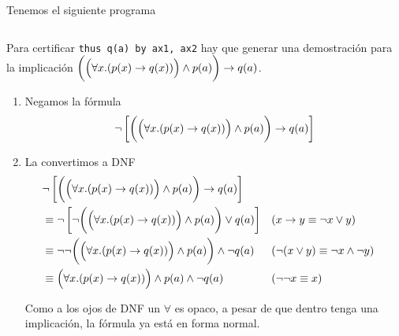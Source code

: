 \begin{ejemplo}
    Tenemos el siguiente programa

    \begin{figure}[H]
        \centering
        \begin{tabular}{c}
            
        \end{tabular}
    \end{figure}

    Para certificar \lstinline{thus q(a) by ax1, ax2} hay que generar una
    demostración para la implicación \(
        \bigg(\Big(\forall x. (p(x) \to q(x))\Big) \wedge p(a) \bigg)
        \to q(a)
    \).

    \begin{enumerate}
        \item Negamos la fórmula 
        \[
            \neg \left[
            \bigg(\Big(\forall x. (p(x) \to q(x))\Big) \wedge p(a) \bigg)
            \to q(a)
        \right]
        \]

        \item La convertimos a DNF
        \begin{align*}
            &\neg \left[
                \bigg(\Big(\forall x. (p(x) \to q(x))\Big) \wedge p(a) \bigg)
                \to q(a)
            \right] \\
            &\equiv \neg \left[
                \neg \bigg(\Big(\forall x. (p(x) \to q(x))\Big) \wedge p(a) \bigg)
                \vee q(a)
            \right] 
                && (x \to y \equiv \neg x \vee y)\\
            &\equiv
                \neg \neg \bigg(\Big(\forall x. (p(x) \to q(x))\Big) \wedge p(a) \bigg)
                \wedge \neg q(a)
                && (\neg(x \vee y) \equiv \neg x \wedge \neg y)\\
            &\equiv \Big(\forall x. (p(x) \to q(x))\Big) \wedge p(a)
            \wedge \neg q(a)
                && (\neg\neg x \equiv x)
        \end{align*}

        Como a los ojos de DNF un $\forall$ es opaco, a pesar de que dentro
        tenga una implicación, la fórmula ya está en forma normal.


\end{enumerate}
\end{ejemplo}
